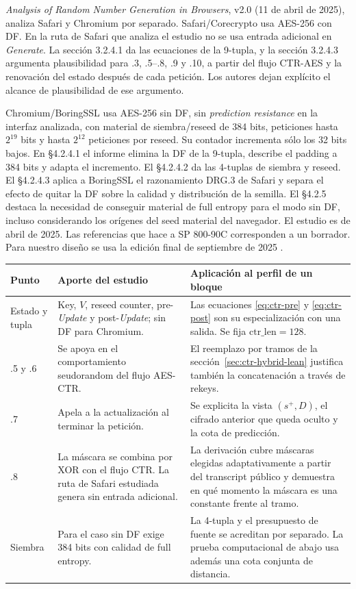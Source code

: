 \documentclass[11pt,a4paper]{article}
\begin{document}
\emph{Analysis of Random Number Generation in Browsers}, v2.0
(11 de abril de 2025), analiza Safari y Chromium por separado.
Safari/Corecrypto usa AES-256 con DF. En la ruta de Safari que
analiza el estudio no se usa entrada adicional en
\emph{Generate}. La sección 3.2.4.1 da las ecuaciones
de la 9-tupla, y la sección 3.2.4.3 argumenta
plausibilidad para .3, .5--.8, .9 y .10, a partir
del flujo CTR-AES y la renovación del estado después
de cada petición. Los autores dejan explícito el
alcance de plausibilidad de ese argumento.

Chromium/BoringSSL usa AES-256 sin DF, sin
\emph{prediction resistance} en la interfaz analizada,
con material de siembra/reseed de 384 bits,
peticiones hasta \(2^{19}\) bits y hasta \(2^{12}\)
peticiones por reseed. Su contador incrementa sólo
los 32 bits bajos. En §4.2.4.1 el informe elimina
la DF de la 9-tupla, describe el padding a 384
bits y adapta el incremento. El §4.2.4.2 da las
4-tuplas de siembra y reseed. El §4.2.4.3 aplica a
BoringSSL el razonamiento DRG.3 de Safari y
separa el efecto de quitar la DF sobre la calidad
y distribución de la semilla. El §4.2.5 destaca
la necesidad de conseguir material de full entropy
para el modo sin DF, incluso considerando los
orígenes del seed material del navegador.
El estudio es de abril de 2025. Las referencias
que hace a SP 800-90C corresponden a un borrador.
Para nuestro diseño se usa la edición final de
septiembre de 2025 \cite[§§3.2.4, 4.2 y 4.2.4--4.2.5]{bsi-browsers}\cite{nist90c}.

\begin{center}
\small
\begin{tabularx}{\linewidth}{@{}lYY@{}}
\toprule
Punto & Aporte del estudio & Aplicación al perfil de un bloque \\
\midrule
Estado y tupla &
Key, \(V\), reseed counter, pre-\emph{Update} y
post-\emph{Update}; sin DF para Chromium. &
Las ecuaciones \eqref{eq:ctr-pre} y \eqref{eq:ctr-post}
son su especialización con una salida. Se fija
\(\mathrm{ctr\_len}=128\). \\
.5 y .6 &
Se apoya en el comportamiento seudorandom del
flujo AES-CTR. &
El reemplazo por tramos de la sección~\ref{sec:ctr-hybrid-lean}
justifica también la concatenación a través de rekeys. \\
.7 &
Apela a la actualización al terminar la petición. &
Se explicita la vista \((s^+,D)\), el cifrado
anterior que queda oculto y la cota de predicción. \\
.8 &
La máscara se combina por XOR con el flujo CTR.
La ruta de Safari estudiada genera sin entrada adicional. &
La derivación cubre máscaras elegidas adaptativamente
a partir del transcript público y demuestra en qué
momento la máscara es una constante frente al tramo. \\
Siembra &
Para el caso sin DF exige 384 bits con calidad
de full entropy. &
La 4-tupla y el presupuesto de fuente se
acreditan por separado. La prueba computacional
de abajo usa además una cota conjunta de distancia. \\
\bottomrule
\end{tabularx}
\end{center}
\end{document}

